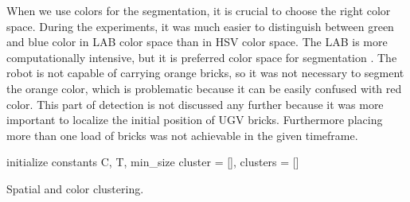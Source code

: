 When we use colors for the segmentation, it is crucial to choose the right color space. During the experiments, it was much easier to distinguish between green and blue color in LAB color space than in HSV color space. The LAB is more computationally intensive, but it is preferred color space for segmentation \cite{wang2014}. The robot is not capable of carrying orange bricks, so it was not necessary to segment the orange color, which is problematic because it can be easily confused with red color. This part of detection is not discussed any further because it was more important to localize the initial position of UGV bricks. Furthermore placing more than one load of bricks was not achievable in the given timeframe.

\begin{algorithm}[H]
	initialize constants C, T, min\_size \;
	cluster = [], 	clusters = []\;
	\caption{Spatial and color clustering.}
	\label{alg:clustering}
\end{algorithm}

\vspace{3mm}

